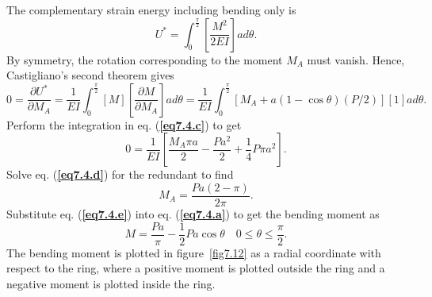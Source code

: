 \documentclass{AeroStructure-ERJohnson}
\begin{document}
\begin{example}
\noindent The complementary strain energy including bending only is
\begin{equation}
U^{*}=\int_{0}^{\frac{\pi}{2}}\left[\frac{M^{2}}{2 E I}\right] a d \theta. \label{eq7.4.b}\tag{b}
\end{equation}
By symmetry, the rotation corresponding to the moment $M_{A}$ must vanish. Hence, Castigliano's second theorem gives
\begin{equation}
0=\frac{\partial U^{*}}{\partial M_{A}}=\frac{1}{E I} \int_{0}^{\frac{\pi}{2}}[M]\left[\frac{\partial M}{\partial M_{A}}\right] a d \theta=\frac{1}{E I} \int_{0}^{\frac{\pi}{2}}\left[M_{A}+a(1-\cos \theta)(P / 2)\right][1] a d \theta. \label{eq7.4.c}\tag{c}
\end{equation}
Perform the integration in eq. (\textbf{\ref{eq7.4.c}}) to get
\begin{equation}
0=\frac{1}{E I}\left[\frac{M_{A} \pi a}{2}-\frac{P a^{2}}{2}+\frac{1}{4} P \pi a^{2}\right]. \label{eq7.4.d}\tag{d}
\end{equation}
Solve eq. (\textbf{\ref{eq7.4.d}}) for the redundant to find
\begin{equation}
M_{A}=\frac{P a(2-\pi)}{2 \pi}. \label{eq7.4.e}\tag{e}
\end{equation}
Substitute eq. (\textbf{\ref{eq7.4.e}}) into eq. (\textbf{\ref{eq7.4.a}}) to get the bending moment as
\begin{equation}
M=\frac{P a}{\pi}-\frac{1}{2} P a \cos \theta \quad 0 \leq \theta \leq \frac{\pi}{2}. \label{eq7.4.f}\tag{f}
\end{equation}
The bending moment is plotted in figure~\ref{fig7.12} as a radial coordinate with respect to the ring, where a positive moment is plotted outside the ring and a negative moment is plotted inside the ring.
\end{example}

{\def\thefigure{7.12}
}
\end{document}
